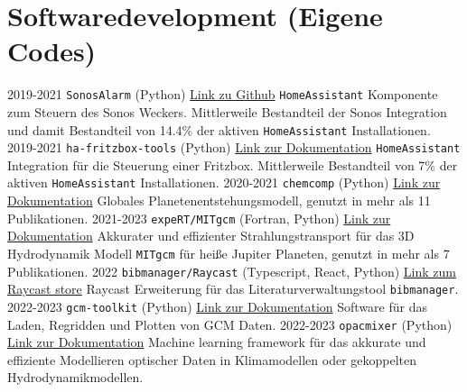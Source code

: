 \documentclass[]{friggeri-cv}
\begin{document}
\section{Softwaredevelopment (Eigene Codes)}
\begin{entrylist}
  \entry
    {2019-2021}
    {\texttt{SonosAlarm} (Python)}
    {\href{https://github.com/AaronDavidSchneider/SonosAlarm}{Link zu Github}}
    {\texttt{HomeAssistant} Komponente zum Steuern des Sonos Weckers. Mittlerweile Bestandteil der Sonos Integration und damit Bestandteil von 14.4\% der aktiven \texttt{HomeAssistant} Installationen.}   
  \entry
    {2019-2021}
    {\texttt{ha-fritzbox-tools} (Python)}
    {\href{https://www.home-assistant.io/integrations/fritz/}{Link zur Dokumentation}}
    {\texttt{HomeAssistant} Integration für die Steuerung einer Fritzbox. Mittlerweile Bestandteil von 7\% der aktiven \texttt{HomeAssistant} Installationen.}           
  \entry
    {2020-2021}
    {\texttt{chemcomp} (Python)}
    {\href{https://chemcomp.readthedocs.io/en/latest/}{Link zur Dokumentation}}
    {Globales Planetenentstehungsmodell, genutzt in mehr als 11 Publikationen.}    
  \entry
    {2021-2023}
    {\texttt{expeRT/MITgcm} (Fortran, Python)}
    {\href{https://exorad.readthedocs.io/en/latest/}{Link zur Dokumentation}}
    {Akkurater und effizienter Strahlungstransport für das 3D Hydrodynamik Modell \texttt{MITgcm}  für heiße Jupiter Planeten, genutzt in mehr als 7 Publikationen.}   
  \entry
    {2022}
    {\texttt{bibmanager/Raycast} (Typescript, React, Python)}
    {\href{https://www.raycast.com/aaronschneider/bibmanager}{Link zum Raycast store}}
    {Raycast Erweiterung für das Literaturverwaltungstool \texttt{bibmanager}.}          
  \entry
    {2022-2023}
    {\texttt{gcm-toolkit} (Python)}
    {\href{https://gcm-toolkit.readthedocs.io/en/latest/}{Link zur Dokumentation}}
    {Software für das Laden, Regridden und Plotten von GCM Daten.}           
  \entry
    {2022-2023}
    {\texttt{opacmixer} (Python)}
    {\href{https://opacmixer.readthedocs.io/en/latest/}{Link zur Dokumentation}}
    {Machine learning framework für das akkurate und effiziente Modellieren optischer Daten in Klimamodellen oder gekoppelten Hydrodynamikmodellen.}      
\end{entrylist}

\newpage
\end{document}
